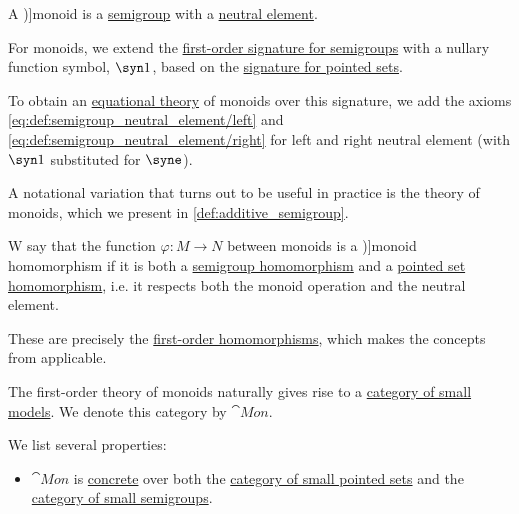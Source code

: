 \begin{definition}\label{def:monoid}
  A \term[ru=моноид (\cite[94]{Мальцев1970АлгебраическиеСистемы})]{monoid} is a \hyperref[def:semigroup]{semigroup} with a \hyperref[def:semigroup_neutral_element]{neutral element}.

  \begin{thmenum}
    \mimprovised For monoids, we extend the \hyperref[def:semigroup/theory]{first-order signature for semigroups} with a nullary function symbol, \( \syn1 \), based on the \hyperref[def:pointed_set]{signature for pointed sets}.

    To obtain an \hyperref[def:fol_equational_theory]{equational theory} of monoids over this signature, we add the axioms \eqref{eq:def:semigroup_neutral_element/left} and \eqref{eq:def:semigroup_neutral_element/right} for left and right neutral element (with \( \syn1 \) substituted for \( \syne \)).

    A notational variation that turns out to be useful in practice is the theory of monoids, which we present in \cref{def:additive_semigroup}.

     W say that the function \( \varphi: M \to N \) between monoids is a \term[en=homomorphism (of monoids) (\cite[def. 1.6]{Jacobson1985BasicAlgebraI})]{monoid homomorphism} if it is both a \hyperref[def:semigroup/morphism]{semigroup homomorphism} and a \hyperref[def:pointed_set/morphism]{pointed set homomorphism}, i.e. it respects both the monoid operation and the neutral element.

    These are precisely the \hyperref[def:fol_homomorphism]{first-order homomorphisms}, which makes the concepts from  applicable.

     The first-order theory of monoids naturally gives rise to a \hyperref[def:fol_theory_model_functor/obj]{category of small models}. We denote this category by \( \cat{Mon} \).

    We list several properties:
    \begin{itemize}
      \item \( \cat{Mon} \) is \hyperref[def:concrete_category]{concrete} over both the \hyperref[def:pointed_set/category]{category of small pointed sets} and the \hyperref[def:pointed_set/category]{category of small semigroups}.


\end{itemize}
\end{thmenum}
\end{definition}
